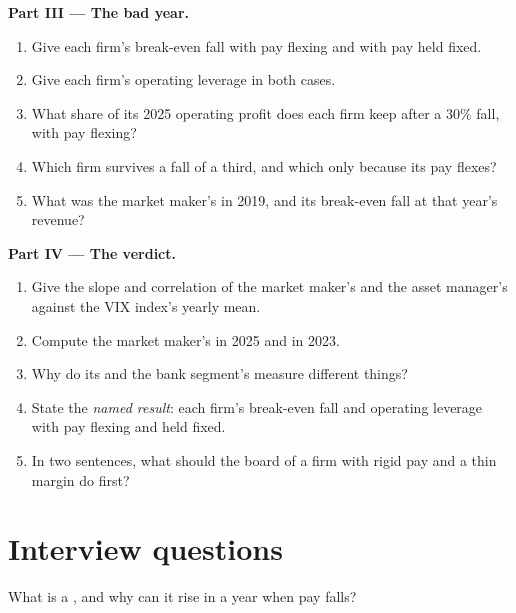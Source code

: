 \begin{problem}
\medskip\noindent\textbf{Part III --- The bad year.}
\begin{enumerate}[resume]
\item Give each firm's break-even fall with pay flexing and with pay held fixed.
\item Give each firm's operating leverage in both cases.
\item What share of its 2025 operating profit does each firm keep after a 30\% fall, with pay flexing?
\item Which firm survives a fall of a third, and which only because its pay flexes?
\item What was the market maker's  in 2019, and its break-even fall at that year's revenue?
\end{enumerate}

\medskip\noindent\textbf{Part IV --- The verdict.}
\begin{enumerate}[resume]
\item Give the slope and correlation of the market maker's and the asset manager's  against the VIX index's yearly mean.
\item Compute the market maker's  in 2025 and in 2023.
\item Why do its  and the bank segment's measure different things?
\item State the \emph{named result}: each firm's break-even fall and operating leverage with pay flexing and held fixed.
\item In two sentences, what should the board of a firm with rigid pay and a thin margin do first?
\end{enumerate}
\end{problem}

\section{Interview questions}

\begin{interviewq}\label{iq:fm:the-economics-of-a-trading-firm:1}
What is a , and why can it rise in a year when pay falls?
\end{interviewq}

